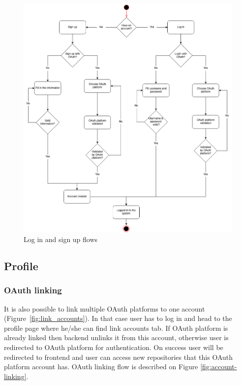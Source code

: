 \begin{figure}[H]
    \includegraphics[width=\textwidth]{figures/login_signup_user_flow}
    \caption{Log in and sign up flows}
    \label{fig:login-signup-diagram}
\end{figure}

\subsection{Profile}\label{subsec:profile}
\subsubsection{OAuth linking}\label{subsubsec:oauth-linking}
It is also possible to link multiple OAuth platforms to one account (Figure~\ref{fig:link_accounts}).
In that case user has to log in and head to the profile page where he/she can find link accounts tab.
If OAuth platform is already linked then backend unlinks it from this account, otherwise user is redirected to OAuth platform for authentication.
On success user will be redirected to frontend and user can access new repositories that this OAuth platform account has.
OAuth linking flow is described on Figure
\ref{fig:account-linking}.

